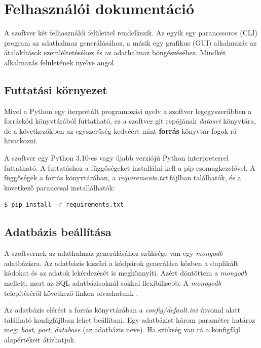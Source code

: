\chapter{Felhasználói dokumentáció}
\label{ch:user}

A szoftver két felhasználói felülettel rendelkezik.
Az egyik egy parancssoros (CLI) program az adathalmaz generálásához,
a másik egy grafikus (GUI) alkalmazás az átalakítások szemléltetéséhez és az adathalmaz böngészéséhez.
Mindkét alkalmazás felületének nyelve angol.

\section{Futtatási környezet}

Mivel a Python egy iterpretált programozási nyelv a szoftver legegyszerűbben
a forráskód könyvtárából futtatható, ez a szoftver git repójának \emph{dataset} könyvtára,
de a következőkben az egyszerűség kedvéért mint \textbf{forrás} könyvtár fogok rá hivatkozni.

A szoftver egy Python 3.10-es vagy újabb verziójú Python interpreterrel futtatható.
A futtatáshoz a függőségeket installálni kell a pip csomagkezelővel.
A függőségek a forrás könyvtárában, a \emph{requirements.txt} fájlban találhatók,
és a következő paranccsal installálhatók:

\begin{lstlisting}[language=bash]
	$ pip install -r requirements.txt
\end{lstlisting}

\section{Adatbázis beállítása}

A szoftvernek az adathalmaz generálásához szüksége van egy \emph{mongodb} adatbázisra.
Az adatbázis kiszűri a kódpárok generálása közben a duplikált kódokat
és az adatok lekérdezését is megkönnyíti.
Azért döntöttem a \emph{mongodb} mellett, mert az SQL adatbázisoknál sokkal flexibilisebb.
A \emph{monogodb} telepítéséről következő linken olvashatunk \cite{installMongodb}.

Az adatbázis elérést a forrás könyvtárában a \emph{config/default.ini} útvonal alatt található
konfigfájlban lehet beállítani.
Egy adatbázist három paraméter határoz meg: \emph{host}, \emph{port}, \emph{database} (az adatbázis neve).
Ha szükség van rá a konfigfájl alapértékeit átírhatjuk.

